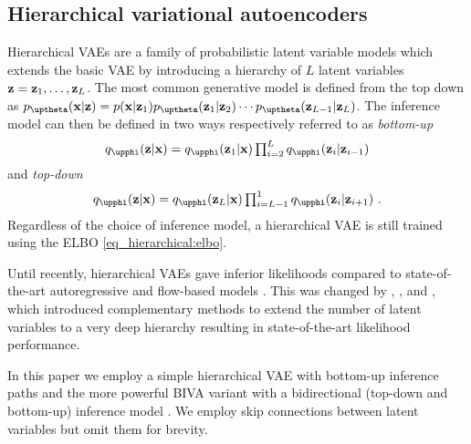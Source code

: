 {\subsection{Hierarchical variational autoencoders}\label{sec_paper_hierarchical:background-hie-VAE}
Hierarchical VAEs are a family of probabilistic latent variable models which extends the basic VAE by introducing a hierarchy of $L$ latent variables ${\mathbf{z}}={\mathbf{z}}_1, \dots, {\mathbf{z}}_L$.
The most common generative model is defined from the top down as $p_\thetab(\xb|\zb)=p(\xb|\zb_1)p_\thetab(\zb_1|\zb_2)\cdots p_\thetab(\zb_{L-1}|\zb_L)$.
The inference model can then be defined in two ways respectively referred to as \textit{bottom-up} \parencite{burda_importance_2016}
\begin{equation}
    q_\phib(\zb|\xb) = q_\phib(\zb_1|\xb)\textstyle\prod_{i=2}^{L} q_\phib(\zb_i|\zb_{i-1})
\end{equation}
and \textit{top-down} \parencite{sonderby_ladder_2016}
\begin{equation}
    q_\phib(\zb|\xb) = q_\phib(\zb_L|\xb)\textstyle\prod_{i=L-1}^{1} q_\phib(\zb_{i}|\zb_{i+1}) \ .
\end{equation}
Regardless of the choice of inference model, a hierarchical VAE is still trained using the ELBO \cref{eq_hierarchical:elbo}.

Until recently, hierarchical VAEs gave inferior likelihoods compared to state-of-the-art autoregressive \parencite{ho_flow_2019} and flow-based models \parencite{salimans_pixelcnn_2017}.
This was changed by \textcite{maaloe_biva_2019}, \textcite{vahdat_nvae_2020}, and \textcite{child_very_2021}, which introduced complementary methods to extend the number of latent variables to a very deep hierarchy resulting in state-of-the-art likelihood performance.

In this paper we employ a simple hierarchical VAE with bottom-up inference paths and the more powerful BIVA variant with a bidirectional (top-down and bottom-up) inference model \parencite{maaloe_biva_2019}. We employ skip connections between latent variables but omit them for brevity.


}
